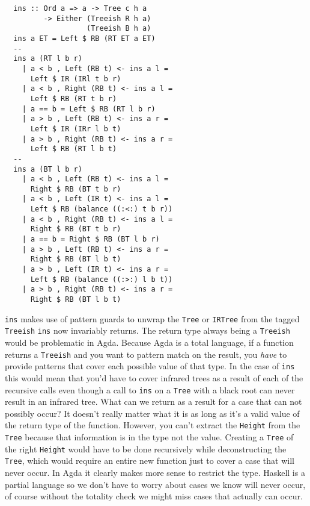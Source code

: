 \documentclass[journal, retainorgcmds]{IEEEtran}
\newcommand{\iagda}[1]{\texttt{#1}}
\newcommand{\ihask}[1]{\texttt{#1}}
\begin{document}
\begin{verbatim}
  ins :: Ord a => a -> Tree c h a
         -> Either (Treeish R h a)
                   (Treeish B h a)
  ins a ET = Left $ RB (RT ET a ET)
  --
  ins a (RT l b r)
    | a < b , Left (RB t) <- ins a l =
      Left $ IR (IRl t b r)
    | a < b , Right (RB t) <- ins a l =
      Left $ RB (RT t b r)
    | a == b = Left $ RB (RT l b r)
    | a > b , Left (RB t) <- ins a r =
      Left $ IR (IRr l b t)
    | a > b , Right (RB t) <- ins a r =
      Left $ RB (RT l b t)
  --
  ins a (BT l b r)
    | a < b , Left (RB t) <- ins a l =
      Right $ RB (BT t b r)
    | a < b , Left (IR t) <- ins a l =
      Left $ RB (balance ((:<:) t b r))
    | a < b , Right (RB t) <- ins a l =
      Right $ RB (BT t b r)
    | a == b = Right $ RB (BT l b r)
    | a > b , Left (RB t) <- ins a r =
      Right $ RB (BT l b t)
    | a > b , Left (IR t) <- ins a r =
      Left $ RB (balance ((:>:) l b t))
    | a > b , Right (RB t) <- ins a r =
      Right $ RB (BT l b t)
\end{verbatim}

\ihask{ins} makes use of pattern guards \cite{patguard} to unwrap the
\ihask{Tree} or \ihask{IRTree} from the tagged \ihask{Treeish} \ihask{ins} now
invariably returns.
The return type always being a \ihask{Treeish} would be problematic in Agda.
Because Agda is a total language, if a function returns a \iagda{Treeish} and
you want to pattern match on the result, you \emph{have} to provide patterns
that cover each possible value of that type.
In the case of \iagda{ins} this would mean that you'd have to cover infrared
trees as a result of each of the recursive calls even though a call to
\iagda{ins} on a \iagda{Tree} with a black root can never result in an infrared
tree.
What can we return as a result for a case that can not possibly occur?
It doesn't really matter what it is as long as it's a valid value of the return
type of the function.
However, you can't extract the \iagda{Height} from the \iagda{Tree} because
that information is in the type not the value.
Creating a \iagda{Tree} of the right \iagda{Height} would have to be done
recursively while deconstructing the \iagda{Tree}, which would require an
entire new function just to cover a case that will never occur.
In Agda it clearly makes more sense to restrict the type.
Haskell is a partial language so we don't have to worry about cases we know
will never occur, of course without the totality check we might miss cases that
actually can occur.
\end{document}
